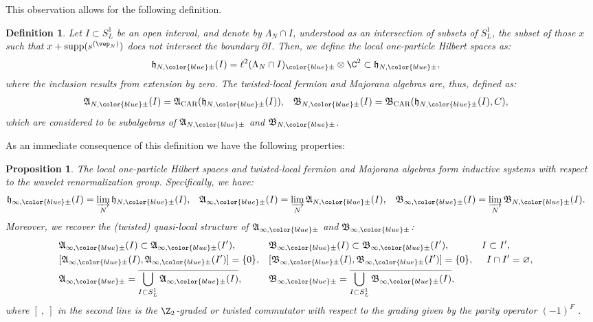 \documentclass[a4paper, 11pt]{article}
\renewcommand{\emptyset}{\varnothing}
\newcommand{\fA}{\mathfrak{A}}\newcommand{\cA}{\mathcal{A}}\newcommand{\dA}{\mathds{A}}\newcommand{\sA}{\mathscr{A}}
\newcommand{\fB}{\mathfrak{B}}\newcommand{\cB}{\mathcal{B}}\newcommand{\dB}{\mathds{B}}\newcommand{\sB}{\mathscr{B}}
\newcommand{\fh}{\mathfrak{h}}
\newcommand{\ltwo}{\ell^{2}}
\DeclareMathOperator{\1}{\mathds{1}}
\DeclareMathOperator{\supp}{supp}
\DeclareMathOperator{\CAR}{\textup{CAR}}
\newtheorem{prop}[thm]{Proposition}
\newtheorem{defn}[thm]{Definition}
\begin{document}
This observation allows for the following definition.
\begin{defn}
\label{def:antiloc}
Let $I\subset S^{1}_{L}$ be an open interval, and denote by $\Lambda_{N}\cap I$, understood as an intersection of subsets of $S^{1}_{L}$, the subset of those $x$ such that $x+\supp(s^{(\vep_{N})})$ does not intersect the boundary $\partial I$. Then, we define the \emph{local one-particle Hilbert spaces} as:
\begin{align*}
\fh_{N,{\color{blue}\pm}}(I) & = \ltwo(\Lambda_{N}\cap I)_{{\color{blue}\pm}}\otimes\C^{2}\subset\fh_{N,{\color{blue}\pm}},
\end{align*}
where the inclusion results from extension by zero. The \emph{twisted-local fermion and Majorana algebras} are, thus, defined as:
\begin{align*}
\fA_{N,{\color{blue}\pm}}(I) & = \fA_{\CAR}(\fh_{N,{\color{blue}\pm}}(I)), & \fB_{N,{\color{blue}\pm}}(I) & = \fB_{\CAR}(\fh_{N,{\color{blue}\pm}}(I),C),
\end{align*}
which are considered to be subalgebras of $\fA_{N,{\color{blue}\pm}}$ and $\fB_{N,{\color{blue}\pm}}$.
\end{defn}
As an immediate consequence of this definition we have the following properties:
\begin{prop}
\label{prop:antilocal}
The local one-particle Hilbert spaces and twisted-local fermion and Majorana algebras form inductive systems with respect to the wavelet renormalization group. Specifically, we have:
\begin{align*}
\fh_{\infty,{\color{blue}\pm}}(I) & = \varinjlim_{N}\fh_{N,{\color{blue}\pm}}(I), & \fA_{\infty,{\color{blue}\pm}}(I) & = \varinjlim_{N}\fA_{N,{\color{blue}\pm}}(I), & \fB_{\infty,{\color{blue}\pm}}(I) & = \varinjlim_{N}\fB_{N,{\color{blue}\pm}}(I).
\end{align*}
Moreover, we recover the (twisted) quasi-local structure of $\fA_{\infty,{\color{blue}\pm}}$ and $\fB_{\infty,{\color{blue}\pm}}$:
\begin{align*}
& \fA_{\infty,{\color{blue}\pm}}(I)\subset\fA_{\infty,{\color{blue}\pm}}(I'), &  & \fB_{\infty,{\color{blue}\pm}}(I)\subset\fB_{\infty,{\color{blue}\pm}}(I'), & I\subset I', \\
& [\fA_{\infty,{\color{blue}\pm}}(I),\fA_{\infty,{\color{blue}\pm}}(I')] = \{0\}, &  & [\fB_{\infty,{\color{blue}\pm}}(I),\fB_{\infty,{\color{blue}\pm}}(I')] = \{0\}, & I\cap I' & = \emptyset, \\
& \fA_{\infty,{\color{blue}\pm}} = \overline{\bigcup_{I\subset S^{1}_{L}}\fA_{\infty,{\color{blue}\pm}}(I)}, &  & \fB_{\infty,{\color{blue}\pm}} = \overline{\bigcup_{I\subset S^{1}_{L}}\fB_{\infty,{\color{blue}\pm}}(I)},
\end{align*}
where $[\!\ ,\!\ ]$ in the second line is the $\Z_{2}$-graded or twisted commutator with respect to the grading given by the parity operator $(-1)^{F}$ \cite{BratteliOperatorAlgebrasAnd1}.
\end{prop}
\end{document}
